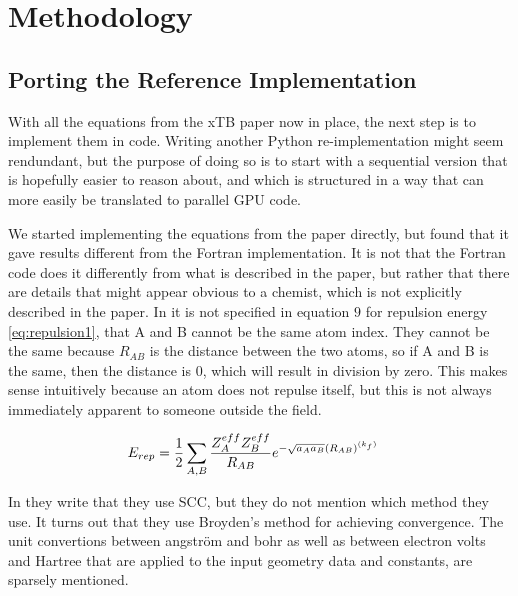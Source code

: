 \chapter{Methodology}\label{sec:meth}

\section{Porting the Reference Implementation}

With all the equations from the xTB paper now in place, the next step is to implement them in code. Writing another Python re-implementation might seem rendundant, but the purpose of doing so is to start with a sequential version that is hopefully easier to reason about, and which is structured in a way that can more easily be translated to parallel GPU code.

We started implementing the equations from the paper directly, but found that it gave results different from the Fortran implementation. It is not that the Fortran code does it differently from what is described in the paper, but rather that there are details that might appear obvious to a chemist, which is not explicitly described in the paper. In \cite{bannwarth2019} it is not specified in equation $9$ for repulsion energy \eqref{eq:repulsion1}, that A and B cannot be the same atom index. They cannot be the same because $R_{AB}$ is the distance between the two atoms, so if A and B is the same, then the distance is $0$, which will result in division by zero. This makes sense intuitively because an atom does not repulse itself, but this is not always immediately apparent to someone outside the field.

\begin{align}
  \E{rep} &= \frac{1}{2}\sum_{A,B}\frac{Z^{eff}_A Z^{eff}_B}{R_{AB}}e^{-\sqrt{a_Aa_B}(R_{AB})^{(k_f)}} \label{eq:repulsion1}
\end{align}



In \cite{grimme2017} they write that they use SCC, but they do not mention which method they use. It turns out that they use Broyden's method for achieving convergence. The unit convertions between angström and bohr as well as between electron volts and Hartree that are applied to the input geometry data and constants, are sparsely mentioned.

